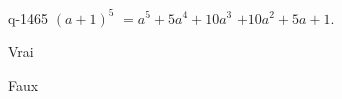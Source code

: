 \begin{truefalse}{q-1465}
$(a+1)^5$ $=a^5+5a^4+10a^3$ $+10a^2+5a+1$.
\item* Vrai
\item Faux
\end{truefalse}

